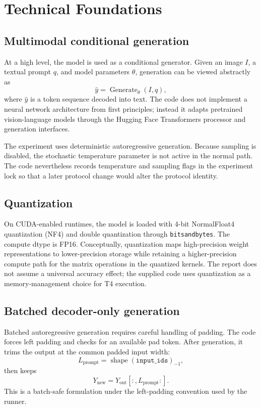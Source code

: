 \documentclass[11pt,a4paper]{article}
\newcommand{\code}[1]{\texttt{#1}}
\begin{document}
\section{Technical Foundations}
\subsection{Multimodal conditional generation}
At a high level, the model is used as a conditional generator. Given an image \(I\), a textual prompt \(q\), and model parameters \(\theta\), generation can be viewed abstractly as
\begin{equation}
\hat{y} = \operatorname{Generate}_{\theta}(I,q),
\end{equation}
where \(\hat{y}\) is a token sequence decoded into text. The code does not implement a neural network architecture from first principles; instead it adapts pretrained vision-language models through the Hugging Face Transformers processor and generation interfaces.

The experiment uses deterministic autoregressive generation. Because sampling is disabled, the stochastic temperature parameter is not active in the normal path. The code nevertheless records temperature and sampling flags in the experiment lock so that a later protocol change would alter the protocol identity.

\subsection{Quantization}
On CUDA-enabled runtimes, the model is loaded with 4-bit NormalFloat4 quantization (NF4) and double quantization through \code{bitsandbytes}. The compute dtype is FP16. Conceptually, quantization maps high-precision weight representations to lower-precision storage while retaining a higher-precision compute path for the matrix operations in the quantized kernels. The report does not assume a universal accuracy effect; the supplied code uses quantization as a memory-management choice for T4 execution.

\subsection{Batched decoder-only generation}
Batched autoregressive generation requires careful handling of padding. The code forces left padding and checks for an available pad token. After generation, it trims the output at the common padded input width:
\begin{equation}
L_{\mathrm{prompt}} = \operatorname{shape}\!\left(\texttt{input\_ids}\right)_{-1},
\end{equation}
then keeps
\begin{equation}
Y_{\mathrm{new}} = Y_{\mathrm{out}}[:,L_{\mathrm{prompt}}:].
\end{equation}
This is a batch-safe formulation under the left-padding convention used by the runner.
\end{document}
